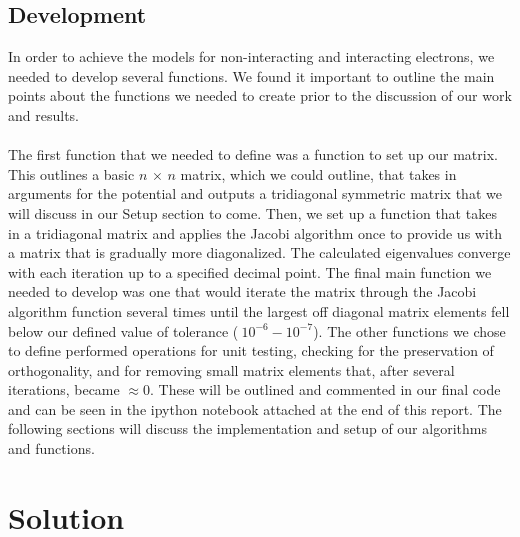 \documentclass{article}
\begin{document}
\subsection{Development}
In order to achieve the models for non-interacting and interacting electrons, we needed to develop several functions. We found it important to outline the main points about the functions we needed to create prior to the discussion of our work and results. \\
\\
The first function that we needed to define was a function to set up our matrix. This outlines a basic $n$ $\times$ $n$ matrix, which we could outline, that takes in arguments for the potential and outputs a tridiagonal symmetric matrix that we will discuss in our Setup section to come. Then, we set up a function that takes in a tridiagonal matrix and applies the Jacobi algorithm once to provide us with a matrix that is gradually more diagonalized. The calculated eigenvalues converge with each iteration up to a specified decimal point. The final main function we needed to develop was one that would iterate the matrix through the Jacobi algorithm function several times until the largest off diagonal matrix elements fell below our defined value of tolerance ($~10^{-6}-10^{-7}$). The other functions we chose to define performed operations for unit testing, checking for the preservation of orthogonality, and for removing small matrix elements that, after several iterations, became $\approx0$. These will be outlined and commented in our final code and can be seen in the ipython notebook attached at the end of this report. The following sections will discuss the implementation and setup of our algorithms and functions.

\section{Solution}
\end{document}
